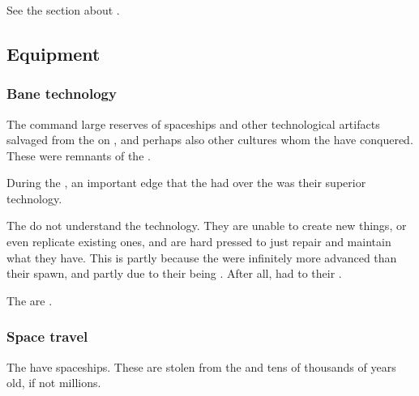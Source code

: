 \subsubsection{\Umbrae}
See the section about . 









\subsection{Equipment}





\subsubsection{Bane technology}
The \banes{} command large reserves of spaceships and other technological artifacts salvaged from the \voyagers{} on \Erebos, and perhaps also other cultures whom the \banes{} have conquered. These were remnants of the .

During the , an important edge that the \banes{} had over the \Miithians was their superior technology. 



The \banes{} do not understand the technology. They are unable to create new things, or even replicate existing ones, and are hard pressed to just repair and maintain what they have. 
This is partly because the \voyagers{} were infinitely more advanced than their \bane{} spawn, and partly due to their being . 
After all, 
 had to 
 their 
.

The  are .





\subsubsection{Space travel}
The \banes{} have spaceships. 
These are stolen from the \voyagers{} and tens of thousands of years old, if not millions. 

